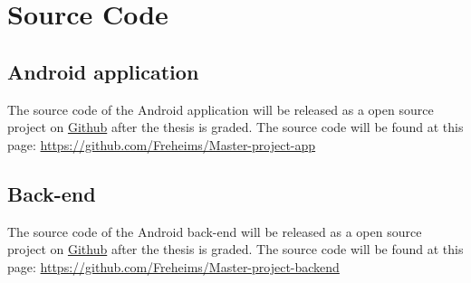 \documentclass[../Main/thesis.tex]{subfiles}
\begin{document}
\chapter{Source Code}

\section{Android application}
The source code of the Android application will be released as a open source project on \href{http://github.com}{Github} after the thesis is graded.
The source code will be found at this page: \url{https://github.com/Freheims/Master-project-app}

\section{Back-end}
The source code of the Android back-end will be released as a open source project on \href{http://github.com}{Github} after the thesis is graded.
The source code will be found at this page: \url{https://github.com/Freheims/Master-project-backend}
\end{document}
